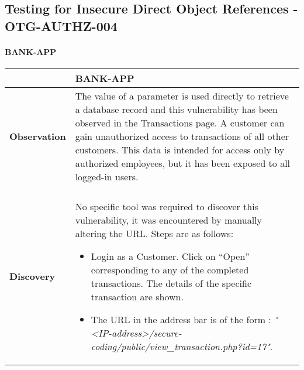 \subsection{Testing for Insecure Direct Object References - OTG-AUTHZ-004}

\paragraph{BANK-APP} \mbox{}
\begin{longtable*}{p{.20\textwidth} | p{.80\textwidth}}
    \hline
    & \textbf{BANK-APP} \\
    \hline
    \textbf{Observation} &
	The value of a parameter is used directly to retrieve a database record and this vulnerability has been observed in the Transactions page.
	A customer can gain unauthorized access to transactions of all other customers. This data is intended for access only by authorized employees, but it has been exposed to all logged-in users.
    \\\\
    \textbf{Discovery} &
       No specific tool was required to discover this vulnerability, it was encountered by manually altering the URL. Steps are as follows:
       \begin{itemize}
	       \item  Login as a Customer. Click on “Open” corresponding to any of the completed transactions. The details of the specific transaction are shown.

	       \item The URL in the address bar is of the form : \textit{"<IP-address>/secure-coding/public/view\_transaction.php?id=17"}.


\end{itemize}
\end{longtable*}
